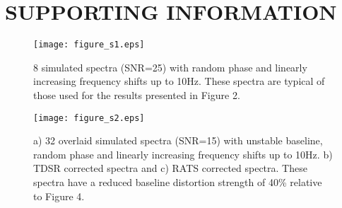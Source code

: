 \documentclass[num-refs]{wiley-article}
\begin{document}
\section*{SUPPORTING INFORMATION}

\begin{figure}[H]
\begin{center}
\texttt{[image: figure\_s1.eps]}
\caption{8 simulated spectra (SNR=25) with random phase and linearly increasing frequency shifts up to 10Hz. These spectra are typical of those used for the results presented in Figure 2.}
\label{freq}
\end{center}
\end{figure}

\begin{figure}[h]
\begin{center}
\texttt{[image: figure\_s2.eps]}
\caption{a) 32 overlaid simulated spectra (SNR=15) with unstable baseline, random phase and linearly increasing frequency shifts up to 10Hz. b) TDSR corrected spectra and c) RATS corrected spectra. These spectra have a reduced baseline distortion strength of 40\% relative to Figure 4.}
\label{freq}
\end{center}
\end{figure}
\end{document}
